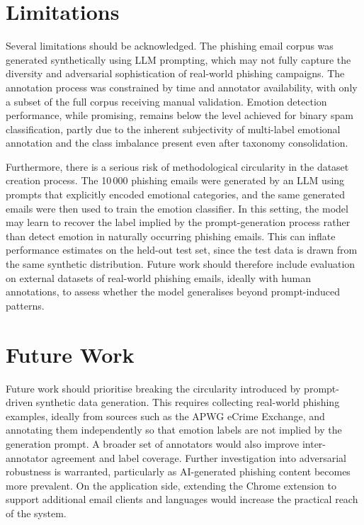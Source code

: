 \section{Limitations}

Several limitations should be acknowledged. The phishing email corpus was generated synthetically using \acs{LLM} prompting, which may not fully capture the diversity and adversarial sophistication of real-world phishing campaigns. The annotation process was constrained by time and annotator availability, with only a subset of the full corpus receiving manual validation. Emotion detection performance, while promising, remains below the level achieved for binary spam classification, partly due to the inherent subjectivity of multi-label emotional annotation and the class imbalance present even after taxonomy consolidation.

Furthermore, there is a serious risk of methodological circularity in the dataset creation process. The 10\,000 phishing emails were generated by an \acs{LLM} using prompts that explicitly encoded emotional categories, and the same generated emails were then used to train the emotion classifier. In this setting, the model may learn to recover the label implied by the prompt-generation process rather than detect emotion in naturally occurring phishing emails. This can inflate performance estimates on the held-out test set, since the test data is drawn from the same synthetic distribution. Future work should therefore include evaluation on external datasets of real-world phishing emails, ideally with human annotations, to assess whether the model generalises beyond prompt-induced patterns.

\section{Future Work}

Future work should prioritise breaking the circularity introduced by prompt-driven synthetic data generation. This requires collecting real-world phishing examples, ideally from sources such as the \acs{APWG} eCrime Exchange, and annotating them independently so that emotion labels are not implied by the generation prompt. A broader set of annotators would also improve inter-annotator agreement and label coverage. Further investigation into adversarial robustness is warranted, particularly as \acs{AI}-generated phishing content becomes more prevalent. On the application side, extending the Chrome extension to support additional email clients and languages would increase the practical reach of the system.